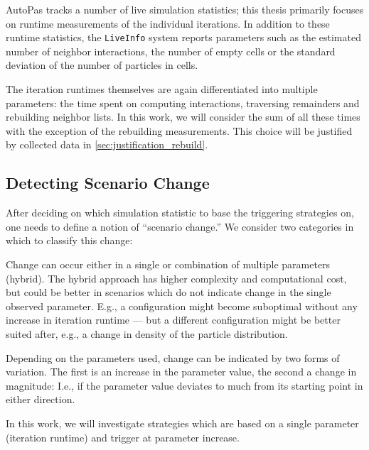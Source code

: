 AutoPas tracks a number of live simulation statistics; this thesis primarily focuses on runtime measurements of the individual iterations.
In addition to these runtime statistics, the \texttt{LiveInfo} system reports parameters such as the estimated number of neighbor interactions, the number of empty cells or the standard deviation of the number of particles in cells. \cite{Newcome2025}

The iteration runtimes themselves are again differentiated into multiple parameters: the time spent on computing interactions, traversing remainders and rebuilding neighbor lists.
In this work, we will consider the sum of all these times with the exception of the rebuilding measurements. This choice will be justified by collected data in \autoref{sec:justification_rebuild}.

\subsection{Detecting Scenario Change}
\label{sec:change_detection}
After deciding on which simulation statistic to base the triggering strategies on, one needs to define a notion of \enquote{scenario change.} We consider two categories in which to classify this change:

\begin{description}[leftmargin=!,labelwidth=\widthof{\textbf{Type of variation }}]
	\item[\textbf{Parameter Space}] Change can occur either in a single or combination of multiple parameters (hybrid). The hybrid approach has higher complexity and computational cost, but could be better in scenarios which do not indicate change in the single observed parameter. E.g., a configuration might become suboptimal without any increase in iteration runtime --- but a different configuration might be better suited after, e.g., a change in density of the particle distribution.
	\item[\textbf{Type of Variation}] Depending on the parameters used, change can be indicated by two forms of variation. The first is an increase in the parameter value, the second a change in magnitude: I.e., if the parameter value deviates to much from its starting point in either direction.
\end{description}

In this work, we will investigate strategies which are based on a single parameter (iteration runtime) and trigger at parameter increase.


